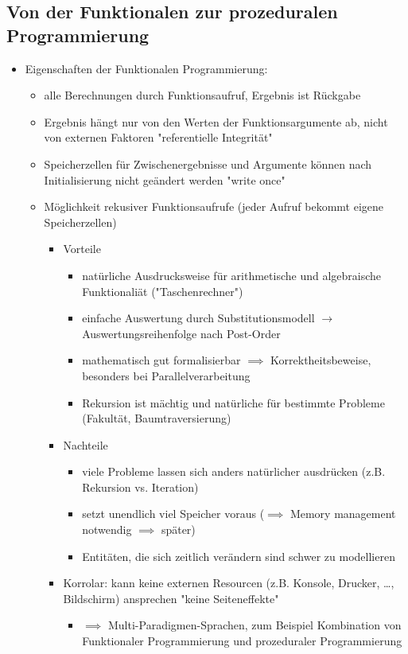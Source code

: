 \documentclass[a4paper]{scrartcl}
\begin{document}
\subsection{Von der Funktionalen zur prozeduralen Programmierung}
\label{sec-7-1}
\begin{itemize}
\item Eigenschaften der Funktionalen Programmierung:
\begin{itemize}
\item alle Berechnungen durch Funktionsaufruf, Ergebnis ist Rückgabe
\item Ergebnis hängt nur von den Werten der Funktionsargumente ab, nicht von externen Faktoren "referentielle Integrität"
\item Speicherzellen für Zwischenergebnisse und Argumente können nach Initialisierung nicht geändert werden "write once"
\item Möglichkeit rekusiver Funktionsaufrufe (jeder Aufruf bekommt eigene Speicherzellen)
\begin{itemize}
\item Vorteile
\begin{itemize}
\item natürliche Ausdrucksweise für arithmetische und algebraische Funktionaliät ("Taschenrechner")
\item einfache Auswertung durch Substitutionsmodell $\rightarrow$ Auswertungsreihenfolge nach Post-Order
\item mathematisch gut formalisierbar $\implies$ Korrektheitsbeweise, besonders bei Parallelverarbeitung
\item Rekursion ist mächtig und natürliche für bestimmte Probleme (Fakultät, Baumtraversierung)
\end{itemize}
\item Nachteile
\begin{itemize}
\item viele Probleme lassen sich anders natürlicher ausdrücken (z.B. Rekursion vs. Iteration)
\item setzt unendlich viel Speicher voraus ($\implies$ Memory management notwendig $\implies$ später)
\item Entitäten, die sich zeitlich verändern sind schwer zu modellieren
\end{itemize}
\item Korrolar: kann keine externen Resourcen (z.B. Konsole, Drucker, \ldots, Bildschirm) ansprechen "keine Seiteneffekte"
\begin{itemize}
\item $\implies$ Multi-Paradigmen-Sprachen, zum Beispiel Kombination von Funktionaler Programmierung und prozeduraler Programmierung
\end{itemize}
\end{itemize}
\end{itemize}
\end{itemize}
\end{document}
